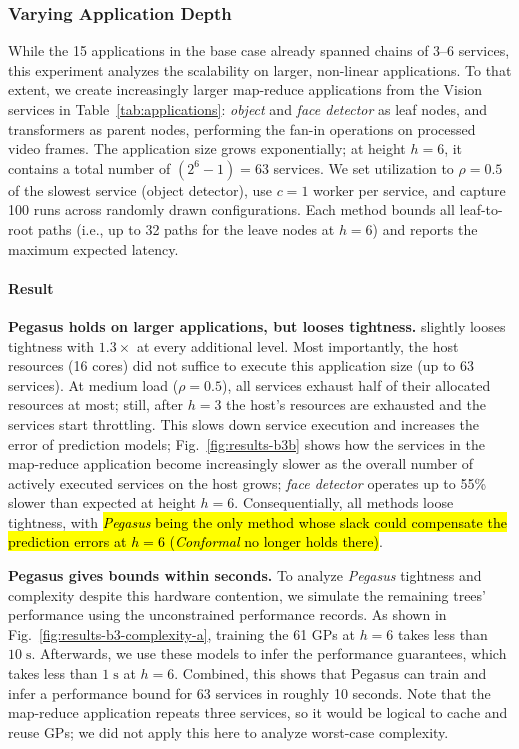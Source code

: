 \subsubsection{Varying Application Depth}
\label{subsec:ex-chain-depth}

While the 15 applications in the base case already spanned chains of 3--6 services, this experiment analyzes the scalability on larger, non-linear applications.
%
To that extent, we create increasingly larger map-reduce applications from the Vision services in Table~\ref{tab:applications}: 
\textit{object} and \textit{face detector} as leaf nodes, and transformers as parent nodes, performing the fan-in operations on processed video frames. The application size grows exponentially; at height $h=6$, it contains a total number of $(2^6 -1) = 63$ services.
We set utilization to $\rho=0.5$ of the slowest service (object detector), use $c=1$ worker per service, and capture 100 runs across randomly drawn configurations. 
Each method bounds all leaf-to-root paths (i.e., up to 32 paths for the leave nodes at $h=6$) and reports the maximum expected latency.

\paragraph{Result}
%
\textbf{Pegasus holds on larger applications, but looses tightness. }
%
slightly looses tightness with $1.3\times$ at every additional level.
%
Most importantly, the host resources (16 cores) did not suffice to execute this application size (up to 63 services). At medium load ($\rho=0.5$), all services exhaust half of their allocated resources at most; still, after $h=3$ the host's resources are exhausted and the services start throttling. This slows down service execution and increases the error of prediction models; Fig.~\ref{fig:results-b3b} shows how the services in the map-reduce application become increasingly slower as the overall number of actively executed services on the host grows; \textit{face detector} operates up to 55\% slower than expected at height $h=6$. Consequentially, all methods loose tightness, with \hl{\textit{Pegasus} being the only method whose slack could compensate the prediction errors at $h=6$ (\textit{Conformal} no longer holds there)}.

\textbf{Pegasus gives bounds within seconds. }
%
To analyze \textit{Pegasus} tightness and complexity despite this hardware contention, we simulate the remaining trees' performance using the unconstrained performance records. As shown in Fig.~\ref{fig:results-b3-complexity-a}, training the 61 GPs at $h=6$ takes less than $10\;\text{s}$. Afterwards, we use these models to infer the performance guarantees, which takes less than $1\;\text{s}$ at $h=6$. Combined, this shows that Pegasus can train and infer a performance bound for 63 services in roughly 10 seconds. Note that the map-reduce application repeats three services, so it would be logical to cache and reuse GPs; we did not apply this here to analyze worst-case complexity.

